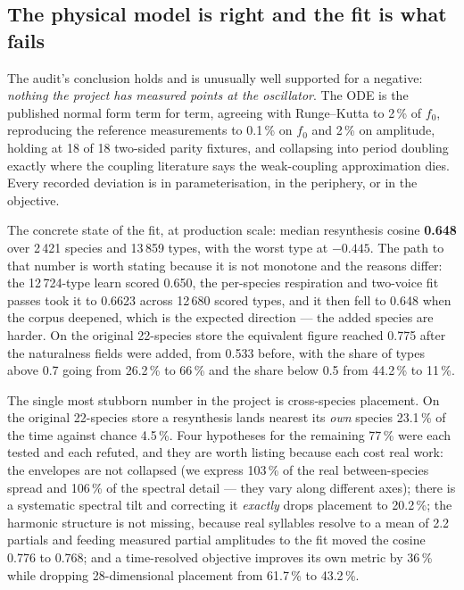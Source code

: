 \documentclass[10pt,twocolumn,a4paper]{article}
\begin{document}
\subsection{The physical model is right and the fit is what fails}

The audit's conclusion holds and is unusually well supported for a negative:
\emph{nothing the project has measured points at the oscillator}. The ODE is the published
normal form term for term, agreeing with Runge--Kutta to 2\,\% of $f_0$, reproducing the
reference measurements to 0.1\,\% on $f_0$ and 2\,\% on amplitude, holding at 18 of 18
two-sided parity fixtures, and collapsing into period doubling exactly where the coupling
literature says the weak-coupling approximation dies. Every recorded deviation is in
parameterisation, in the periphery, or in the objective.

The concrete state of the fit, at production scale: median resynthesis cosine \textbf{0.648}
over 2\,421 species and 13\,859 types, with the worst type at $-0.445$. The path to that number
is worth stating because it is not monotone and the reasons differ: the 12\,724-type learn
scored 0.650, the per-species respiration and two-voice fit passes took it to 0.6623 across
12\,680 scored types, and it then fell to 0.648 when the corpus deepened, which is the expected
direction --- the added species are harder. On the original 22-species store the equivalent
figure reached 0.775 after the naturalness fields were added, from 0.533 before, with the share
of types above 0.7 going from 26.2\,\% to 66\,\% and the share below 0.5 from 44.2\,\% to
11\,\%.

The single most stubborn number in the project is cross-species placement. On the original
22-species store a resynthesis lands nearest its \emph{own} species 23.1\,\% of the time
against chance 4.5\,\%. Four hypotheses for the remaining 77\,\% were each tested and each
refuted, and they are worth listing because each cost real work: the envelopes are not
collapsed (we express 103\,\% of the real between-species spread and 106\,\% of the spectral
detail --- they vary along different axes); there is a systematic spectral tilt and
correcting it \emph{exactly} drops placement to 20.2\,\%; the harmonic structure is not
missing, because real syllables resolve to a mean of 2.2 partials and feeding measured
partial amplitudes to the fit moved the cosine 0.776 to 0.768; and a time-resolved objective
improves its own metric by 36\,\% while dropping 28-dimensional placement from 61.7\,\% to
43.2\,\%.
\end{document}
